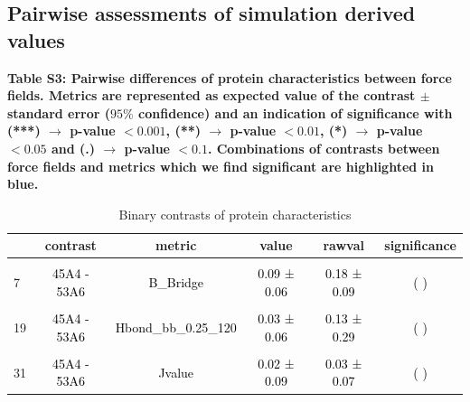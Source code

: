 \documentclass{article}\usepackage[table]{xcolor}
\renewcommand{\$}{$} %
\begin{document}
\subsection{Pairwise assessments of simulation derived values}
\bf{Table S3:} Pairwise differences of protein characteristics between
force fields. Metrics are represented as expected value of the
contrast $\pm$ standard error ($95\%$ confidence) and an indication of
significance with (***) $\rightarrow$ p-value $< 0.001$, (**)
$\rightarrow$ p-value $<0.01$, (*) $\rightarrow$ p-value $<0.05$ and
(.)  $\rightarrow$ p-value $<0.1$. Combinations of contrasts between
force fields and metrics which we find significant are highlighted in
blue.
\begin{center}

\begin{longtable}[t]{lccccc}
\caption{\label{tab:unnamed-chunk-19}Binary contrasts of protein characteristics}\\
\toprule
  & contrast & metric & value & rawval & significance\\
\midrule
\cellcolor{gray!6}{1} & \cellcolor{gray!6}{\textcolor{blue}{45A4 - 53A6}} & \cellcolor{gray!6}{\textcolor{blue}{A\_Helix}} & \cellcolor{gray!6}{\textcolor{blue}{0.36 ± 0.09}} & \cellcolor{gray!6}{\textcolor{blue}{1.26 ± 0.30}} & \cellcolor{gray!6}{\textcolor{black}{(***)}}\\
7 & \textcolor{black}{45A4 - 53A6} & \textcolor{black}{B\_Bridge} & \textcolor{black}{0.09 ± 0.06} & \textcolor{black}{0.18 ± 0.09} & \textcolor{black}{( )}\\
\cellcolor{gray!6}{13} & \cellcolor{gray!6}{\textcolor{black}{45A4 - 53A6}} & \cellcolor{gray!6}{\textcolor{black}{B\_Strand}} & \cellcolor{gray!6}{\textcolor{black}{-0.13 ± 0.09}} & \cellcolor{gray!6}{\textcolor{black}{-0.43 ± 0.21}} & \cellcolor{gray!6}{\textcolor{black}{( )}}\\
19 & \textcolor{black}{45A4 - 53A6} & \textcolor{black}{Hbond\_bb\_0.25\_120} & \textcolor{black}{0.03 ± 0.06} & \textcolor{black}{0.13 ± 0.29} & \textcolor{black}{( )}\\
\cellcolor{gray!6}{25} & \cellcolor{gray!6}{\textcolor{blue}{45A4 - 53A6}} & \cellcolor{gray!6}{\textcolor{blue}{Hbond\_native\_bb\_0.25\_120}} & \cellcolor{gray!6}{\textcolor{blue}{-0.31 ± 0.08}} & \cellcolor{gray!6}{\textcolor{blue}{-1.26 ± 0.35}} & \cellcolor{gray!6}{\textcolor{black}{(**)}}\\
31 & \textcolor{black}{45A4 - 53A6} & \textcolor{black}{Jvalue} & \textcolor{black}{0.02 ± 0.09} & \textcolor{black}{0.03 ± 0.07} & \textcolor{black}{( )}\\

\end{longtable}
\end{center}
\end{document}
